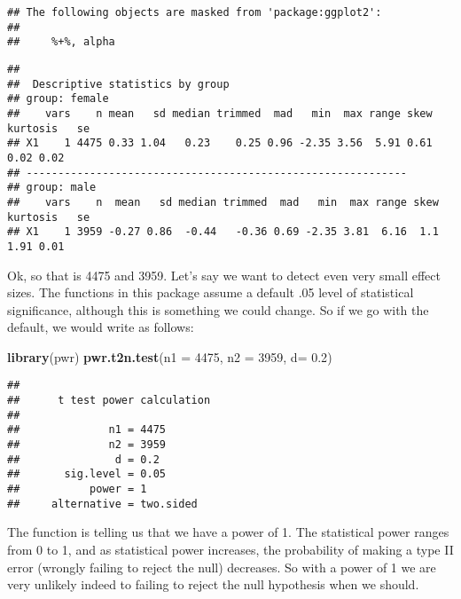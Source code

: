\documentclass[
]{book}
\newenvironment{Shaded}{\begin{snugshade}}{\end{snugshade}}
\newcommand{\AttributeTok}[1]{\textcolor[rgb]{0.13,0.29,0.53}{#1}}
\newcommand{\DecValTok}[1]{\textcolor[rgb]{0.00,0.00,0.81}{#1}}
\newcommand{\FloatTok}[1]{\textcolor[rgb]{0.00,0.00,0.81}{#1}}
\newcommand{\FunctionTok}[1]{\textcolor[rgb]{0.13,0.29,0.53}{\textbf{#1}}}
\newcommand{\NormalTok}[1]{#1}
\newcommand{\SpecialCharTok}[1]{\textcolor[rgb]{0.81,0.36,0.00}{\textbf{#1}}}
\begin{document}
\begin{verbatim}
## The following objects are masked from 'package:ggplot2':
## 
##     %+%, alpha
\end{verbatim}

\begin{Shaded}
\end{Shaded}

\begin{verbatim}
## 
##  Descriptive statistics by group 
## group: female
##    vars    n mean   sd median trimmed  mad   min  max range skew kurtosis   se
## X1    1 4475 0.33 1.04   0.23    0.25 0.96 -2.35 3.56  5.91 0.61     0.02 0.02
## ------------------------------------------------------------ 
## group: male
##    vars    n  mean   sd median trimmed  mad   min  max range skew kurtosis   se
## X1    1 3959 -0.27 0.86  -0.44   -0.36 0.69 -2.35 3.81  6.16  1.1     1.91 0.01
\end{verbatim}

Ok, so that is 4475 and 3959. Let's say we want to detect even very small effect sizes. The functions in this package assume a default .05 level of statistical significance, although this is something we could change. So if we go with the default, we would write as follows:

\begin{Shaded}
\begin{Highlighting}[]
\FunctionTok{library}\NormalTok{(pwr)}
\FunctionTok{pwr.t2n.test}\NormalTok{(}\AttributeTok{n1 =} \DecValTok{4475}\NormalTok{, }\AttributeTok{n2 =} \DecValTok{3959}\NormalTok{, }\AttributeTok{d=} \FloatTok{0.2}\NormalTok{)}
\end{Highlighting}
\end{Shaded}

\begin{verbatim}
## 
##      t test power calculation 
## 
##              n1 = 4475
##              n2 = 3959
##               d = 0.2
##       sig.level = 0.05
##           power = 1
##     alternative = two.sided
\end{verbatim}

The function is telling us that we have a power of 1. The statistical power ranges from 0 to 1, and as statistical power increases, the probability of making a type II error (wrongly failing to reject the null) decreases. So with a power of 1 we are very unlikely indeed to failing to reject the null hypothesis when we should.
\end{document}
